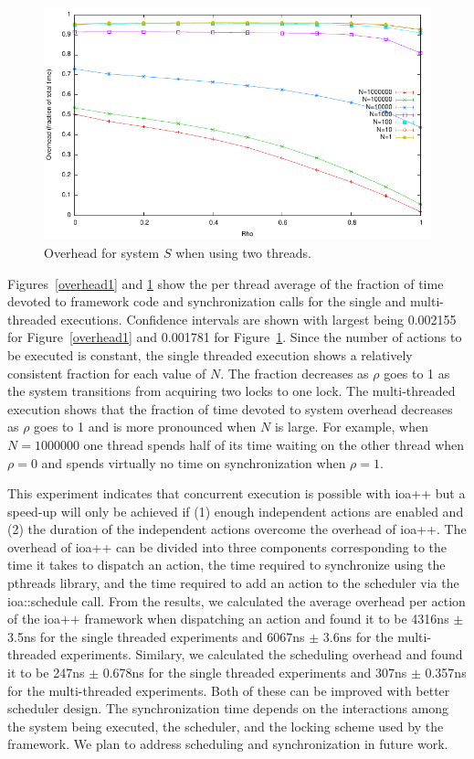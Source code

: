 \begin{figure}
\center
\includegraphics[width=\columnwidth]{overhead2}
\caption{Overhead for system $S$ when using two threads.\label{overhead2}}
\end{figure}

Figures~\ref{overhead1} and \ref{overhead2} show the per thread average of the fraction of time devoted to framework code and synchronization calls for the single and multi-threaded executions.
Confidence intervals are shown with largest being 0.002155 for Figure~\ref{overhead1} and 0.001781 for Figure~\ref{overhead2}.
Since the number of actions to be executed is constant, the single threaded execution shows a relatively consistent fraction for each value of $N$.
The fraction decreases as $\rho$ goes to 1 as the system transitions from acquiring two locks to one lock.
The multi-threaded execution shows that the fraction of time devoted to system overhead decreases as $\rho$ goes to 1 and is more pronounced when $N$ is large.
For example, when $N=1000000$ one thread spends half of its time waiting on the other thread when $\rho = 0$ and spends virtually no time on synchronization when $\rho = 1$.

This experiment indicates that concurrent execution is possible with ioa++ but a speed-up will only be achieved if (1) enough independent actions are enabled and (2) the duration of the independent actions overcome the overhead of ioa++.
The overhead of ioa++ can be divided into three components corresponding to the time it takes to dispatch an action, the time required to synchronize using the pthreads library, and the time required to add an action to the scheduler via the ioa::schedule call.
From the results, we calculated the average overhead per action of the ioa++ framework when dispatching an action and found it to be 4316ns $\pm$ 3.5ns for the single threaded experiments and 6067ns $\pm$ 3.6ns for the multi-threaded experiments.
Similary, we calculated the scheduling overhead and found it to be 247ns $\pm$ 0.678ns for the single threaded experiments and 307ns $\pm$ 0.357ns for the multi-threaded experiments.
Both of these can be improved with better scheduler design.
The synchronization time depends on the interactions among the system being executed, the scheduler, and the locking scheme used by the framework.
We plan to address scheduling and synchronization in future work.
